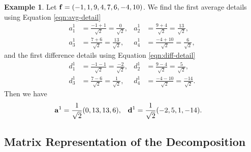 \documentclass{article}
\theoremstyle{definition}
\newtheorem{example}[definition]{Example}
\begin{document}
  \begin{example} \label{eg:decomp-1}
      Let \(\vb{f} = (-1, 1, 9, 4, 7, 6, -4, 10)\). We find the first average details using Equation \eqref{eqn:avg-detail}
      \begin{align*}
      a_1^1 &= \frac{-1+1}{\sqrt{2}} = \frac{0}{\sqrt{2}}, &
      a_2^1 &= \frac{9+4}{\sqrt{2}} = \frac{13}{\sqrt{2}},\\
      a_3^1 &= \frac{7+6}{\sqrt{2}} = \frac{13}{\sqrt{2}}, &
      a_4^1 &= \frac{-4+10}{\sqrt{2}} = \frac{6}{\sqrt{2}},
    \end{align*}
    and the first difference details using Equation \eqref{eqn:diff-detail}
    \begin{align*}
      d_1^1 &= \frac{-1-1}{\sqrt{2}} = \frac{-2}{\sqrt{2}}, &
      d_2^1 &= \frac{9-4}{\sqrt{2}} = \frac{5}{\sqrt{2}},\\
      d_3^1 &= \frac{7-6}{\sqrt{2}} = \frac{1}{\sqrt{2}}, &
      d_4^1 &= \frac{-4-10}{\sqrt{2}} = \frac{-14}{\sqrt{2}}.
    \end{align*}
    Then we have
    \begin{align*}
      \vb{a}^1 &= \frac{1}{\sqrt{2}}(0,13,13,6), &
      \vb{d}^1 &= \frac{1}{\sqrt{2}}(-2,5,1,-14).
    \end{align*}
  \end{example}

  \subsection{Matrix Representation of the Decomposition}
\end{document}
